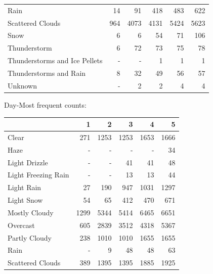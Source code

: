 \documentclass[11pt]{scrartcl}
\begin{document}
\begin{tabular}{lrrrrr}
Rain                          &    14 &    91 &   418 &   483 &    622 \\
Scattered Clouds              &   964 &  4073 &  4131 &  5424 &   5623 \\
Snow                          &     6 &     6 &    54 &    71 &    106 \\
Thunderstorm                  &     6 &    72 &    73 &    75 &     78 \\
Thunderstorms and Ice Pellets &   - &   - &     1 &     1 &      1 \\
Thunderstorms and Rain        &     8 &    32 &    49 &    56 &     57 \\
Unknown                       &   - &     2 &     2 &     4 &      4 \\
\bottomrule
\end{tabular}

Day-Most frequent counts:
\begin{tabular}{lrrrrr}
\toprule
{} &     1 &     2 &     3 &     4 &     5 \\
\midrule
Clear               &   271 &  1253 &  1253 &  1653 &  1666 \\
Haze                &   - &   - &   - &   - &    34 \\
Light Drizzle       &   - &   - &    41 &    41 &    48 \\
Light Freezing Rain &   - &   - &    13 &    13 &    44 \\
Light Rain          &    27 &   190 &   947 &  1031 &  1297 \\
Light Snow          &    54 &    65 &   412 &   470 &   671 \\
Mostly Cloudy       &  1299 &  5344 &  5414 &  6465 &  6651 \\
Overcast            &   605 &  2839 &  3512 &  4318 &  5367 \\
Partly Cloudy       &   238 &  1010 &  1010 &  1655 &  1655 \\
Rain                &   - &     9 &    48 &    48 &    63 \\
Scattered Clouds    &   389 &  1395 &  1395 &  1885 &  1925 \\
\bottomrule
\end{tabular}
\end{document}
